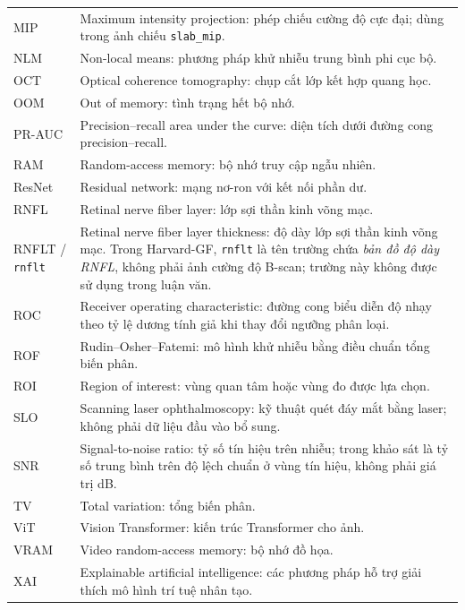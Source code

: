 \documentclass[14pt,a4paper,oneside]{extreport}
\begin{document}
\begin{longtable}{@{}>{\raggedright\arraybackslash}p{}>{\raggedright\arraybackslash}p{}@{}}
  MIP & Maximum intensity projection: phép chiếu cường độ cực đại; dùng trong ảnh chiếu \texttt{slab\_mip}.\\
  NLM & Non-local means: phương pháp khử nhiễu trung bình phi cục bộ.\\
  OCT & Optical coherence tomography: chụp cắt lớp kết hợp quang học.\\
  OOM & Out of memory: tình trạng hết bộ nhớ.\\
  PR-AUC & Precision--recall area under the curve: diện tích dưới đường cong precision--recall.\\
  RAM & Random-access memory: bộ nhớ truy cập ngẫu nhiên.\\
  ResNet & Residual network: mạng nơ-ron với kết nối phần dư.\\
  RNFL & Retinal nerve fiber layer: lớp sợi thần kinh võng mạc.\\
  RNFLT / \texttt{rnflt} & Retinal nerve fiber layer thickness: độ dày lớp sợi thần kinh võng mạc. Trong Harvard-GF, \texttt{rnflt} là tên trường chứa \emph{bản đồ độ dày RNFL}, không phải ảnh cường độ B-scan; trường này không được sử dụng trong luận văn.\\
  ROC & Receiver operating characteristic: đường cong biểu diễn độ nhạy theo tỷ lệ dương tính giả khi thay đổi ngưỡng phân loại.\\
  ROF & Rudin--Osher--Fatemi: mô hình khử nhiễu bằng điều chuẩn tổng biến phân.\\
  ROI & Region of interest: vùng quan tâm hoặc vùng đo được lựa chọn.\\
  SLO & Scanning laser ophthalmoscopy: kỹ thuật quét đáy mắt bằng laser; không phải dữ liệu đầu vào bổ sung.\\
  SNR & Signal-to-noise ratio: tỷ số tín hiệu trên nhiễu; trong khảo sát là tỷ số trung bình trên độ lệch chuẩn ở vùng tín hiệu, không phải giá trị dB.\\
  TV & Total variation: tổng biến phân.\\
  ViT & Vision Transformer: kiến trúc Transformer cho ảnh.\\
  VRAM & Video random-access memory: bộ nhớ đồ họa.\\
  XAI & Explainable artificial intelligence: các phương pháp hỗ trợ giải thích mô hình trí tuệ nhân tạo.\\
\end{longtable}
\endgroup

\clearpage
{}
{}
\listoftables
\end{document}
